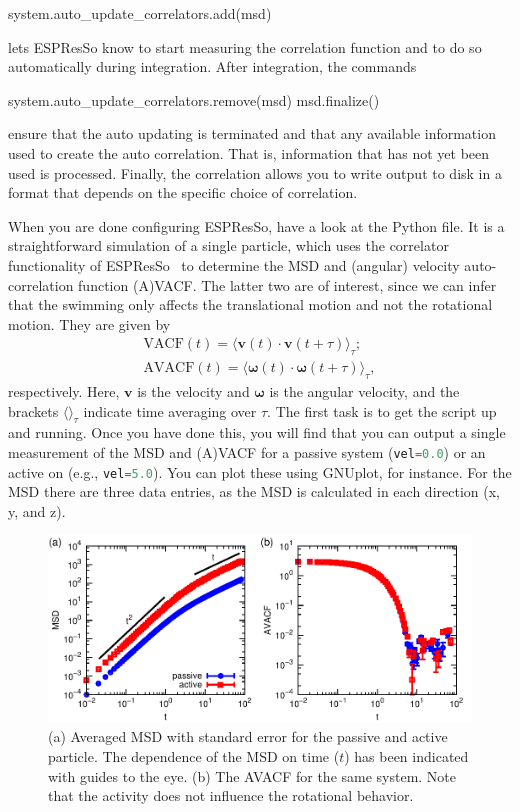 \documentclass[aip,jcp,reprint,a4paper,onecolumn,amsmath]{revtex4-1}
\newcommand{\es}{\mbox{\textsf{ESPResSo}}\xspace}
\newcommand\codees{\lstinline[language=python]}
\begin{document}
\begin{espresso}
system.auto_update_correlators.add(msd)
\end{espresso}
lets \es{} know to start measuring the correlation function and to do so automatically during integration. After integration, the commands
\begin{espresso}
system.auto_update_correlators.remove(msd)
msd.finalize()
\end{espresso}
ensure that the auto updating is terminated and that any available information used to create the auto correlation. That is, information that has not yet been used is processed. Finally, the correlation allows you to write output to disk in a format that depends on the specific choice of correlation.

When you are done configuring \es{}, have a look at the Python file. It is a straightforward simulation of a single particle, which uses the correlator functionality of \es{}~\cite{Arnold_13,UG} to determine the MSD and (angular) velocity auto-correlation function (A)VACF. The latter two are of interest, since we can infer that the swimming only affects the translational motion and not the rotational motion. They are given by
\begin{eqnarray}
\label{eq:vacf} \mathrm{VACF}(t) = \langle \mathbf{v}(t) \cdot \mathbf{v}(t + \tau) \rangle_{\tau}; \\
\label{eq:avacf} \mathrm{AVACF}(t) = \langle \boldsymbol{\omega}(t) \cdot \boldsymbol{\omega}(t + \tau) \rangle_{\tau} ,
\end{eqnarray}
respectively. Here, $\mathbf{v}$ is the velocity and $\boldsymbol{\omega}$ is the angular velocity, and the brackets $\langle \rangle_{\tau}$ indicate time averaging over $\tau$. The first task is to get the script up and running. Once you have done this, you will find that you can output a single measurement of the MSD and (A)VACF for a passive system (\codees{vel=0.0}) or an active on (e.g., \codees{vel=5.0}). You can plot these using GNUplot, for instance. For the MSD there are three data entries, as the MSD is calculated in each direction (x, y, and z).

\begin{figure}[!htb]
\begin{center}
\includegraphics[scale=0.75]{FIGURES/enhanced}
\end{center}
\caption{\label{fig:enhanced}(a) Averaged MSD with standard error for the passive and active particle. The dependence of the MSD on time ($t$) has been indicated with guides to the eye. (b) The AVACF for the same system. Note that the activity does not influence the rotational behavior.}
\end{figure}
\end{document}
